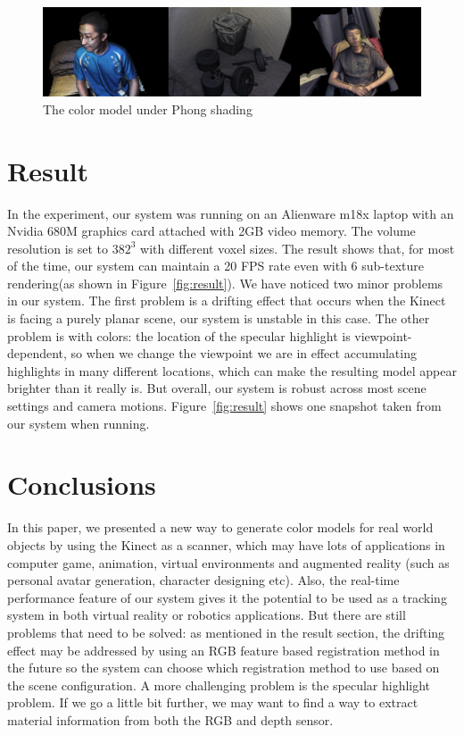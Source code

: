 \documentclass[12pt]{article}
\begin{document}
\begin{figure}[h!]
\includegraphics[width=\textwidth]{result.png}
\caption{\label{fig:shading}The color model under Phong shading}
\end{figure}

\section{Result}
In the experiment, our system was running on an Alienware m18x laptop with an Nvidia 680M graphics card attached with 2GB video memory. The volume resolution is set to $382^3$ with different voxel sizes. The result shows that, for most of the time, our system can maintain a 20 FPS rate even with 6 sub-texture rendering(as shown in Figure~\ref{fig:result}). 
We have noticed two minor problems in our system. The first problem is a drifting effect that occurs when the Kinect is facing a purely planar scene, our system is unstable in this case. The other problem is with colors: the location of the specular highlight is viewpoint-dependent, so when we change the viewpoint we are in effect accumulating highlights in many different locations, which can make the resulting model appear brighter than it really is. But overall, our system is robust across most scene settings and camera motions. Figure~\ref{fig:result} shows one snapshot taken from our system when running.

\section{Conclusions}
In this paper, we presented a new way to generate color models for real world objects by using the Kinect as a scanner, which may have lots of applications in computer game, animation, virtual environments and augmented reality (such as personal avatar generation, character designing etc). Also, the real-time performance feature of our system gives it the potential to be used as a tracking system in both virtual reality or robotics applications. But there are still problems that need to be solved: as mentioned in the result section, the drifting effect may be addressed by using an RGB feature based registration method in the future so the system can choose which registration method to use based on the scene configuration. A more challenging problem is the specular highlight problem. If we go a little bit further, we may want to find a way to extract material information from both the RGB and depth sensor. 
\end{document}
